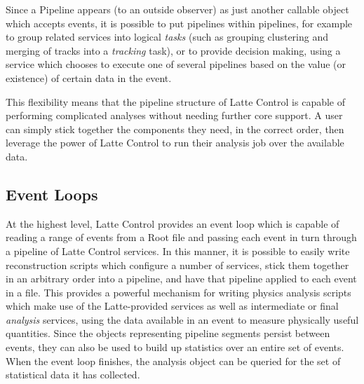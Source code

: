 Since a Pipeline appears (to an outside observer) as just another callable object which accepts events, it is possible to put pipelines within pipelines, for example to group related services into logical \emph{tasks} (such as grouping clustering and merging of tracks into a \emph{tracking} task), or to provide decision making, using a service which chooses to execute one of several pipelines based on the value (or existence) of certain data in the event.

This flexibility means that the pipeline structure of Latte Control is capable of performing complicated analyses without needing further core support. A user can simply stick together the components they need, in the correct order, then leverage the power of Latte Control to run their analysis job over the available data.

\subsection{Event Loops}
At the highest level, Latte Control provides an event loop which is capable of reading a range of events from a {\sc Root} file and passing each event in turn through a pipeline of Latte Control services. In this manner, it is possible to easily write reconstruction scripts which configure a number of services, stick them together in an arbitrary order into a pipeline, and have that pipeline applied to each event in a file. This provides a powerful mechanism for writing physics analysis scripts which make use of the Latte-provided services as well as intermediate or final \emph{analysis} services, using the data available in an event to measure physically useful quantities. Since the objects representing pipeline segments persist between events, they can also be used to build up statistics over an entire set of events. When the event loop finishes, the analysis object can be queried for the set of statistical data it has collected.

